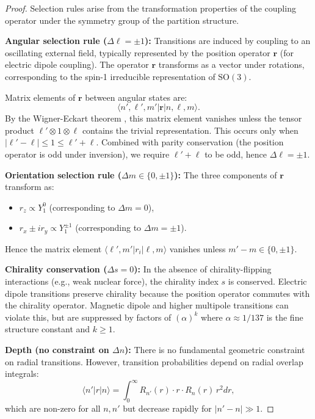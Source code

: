 \documentclass[twocolumn,10pt,a4paper]{article}
\theoremstyle{remark}
\begin{document}
\begin{proof}
Selection rules arise from the transformation properties of the coupling operator under the symmetry group of the partition structure.

\textbf{Angular selection rule ($\Delta \ell = \pm 1$):} Transitions are induced by coupling to an oscillating external field, typically represented by the position operator $\mathbf{r}$ (for electric dipole coupling). The operator $\mathbf{r}$ transforms as a vector under rotations, corresponding to the spin-1 irreducible representation of $\text{SO}(3)$.

Matrix elements of $\mathbf{r}$ between angular states are:
\begin{equation}
\langle n', \ell', m' | \mathbf{r} | n, \ell, m \rangle.
\end{equation}
By the Wigner-Eckart theorem \citep{Wigner1931}, this matrix element vanishes unless the tensor product $\ell' \otimes 1 \otimes \ell$ contains the trivial representation. This occurs only when $|\ell' - \ell| \leq 1 \leq \ell' + \ell$. Combined with parity conservation (the position operator is odd under inversion), we require $\ell' + \ell$ to be odd, hence $\Delta \ell = \pm 1$.

\textbf{Orientation selection rule ($\Delta m \in \{0, \pm 1\}$):} The three components of $\mathbf{r}$ transform as:
\begin{itemize}[noitemsep]
    \item $r_z \propto Y_1^0$ (corresponding to $\Delta m = 0$),
    \item $r_x \pm i r_y \propto Y_1^{\pm 1}$ (corresponding to $\Delta m = \pm 1$).
\end{itemize}
Hence the matrix element $\langle \ell', m' | r_i | \ell, m \rangle$ vanishes unless $m' - m \in \{0, \pm 1\}$.

\textbf{Chirality conservation ($\Delta s = 0$):} In the absence of chirality-flipping interactions (e.g., weak nuclear force), the chirality index $s$ is conserved. Electric dipole transitions preserve chirality because the position operator commutes with the chirality operator. Magnetic dipole and higher multipole transitions can violate this, but are suppressed by factors of $(\alpha)^k$ where $\alpha \approx 1/137$ is the fine structure constant and $k \geq 1$.

\textbf{Depth (no constraint on $\Delta n$):} There is no fundamental geometric constraint on radial transitions. However, transition probabilities depend on radial overlap integrals:
\begin{equation}
\langle n' | r | n \rangle = \int_0^\infty R_{n'}(r) \cdot r \cdot R_n(r) \, r^2 dr,
\end{equation}
which are non-zero for all $n, n'$ but decrease rapidly for $|n' - n| \gg 1$.
\end{proof}
\end{document}
